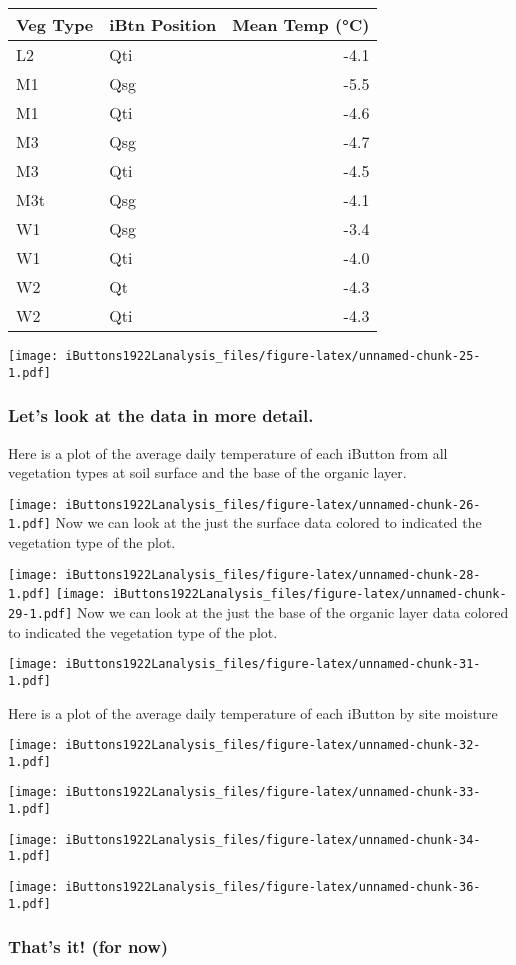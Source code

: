 \documentclass[
]{article}
\begin{document}
\begin{longtable}[]{@{}llr@{}}
\toprule\noalign{}
Veg Type & iBtn Position & Mean Temp (°C) \\
\midrule\noalign{}
\endhead
\bottomrule\noalign{}
\endlastfoot
L2 & Qti & -4.1 \\
M1 & Qsg & -5.5 \\
M1 & Qti & -4.6 \\
M3 & Qsg & -4.7 \\
M3 & Qti & -4.5 \\
M3t & Qsg & -4.1 \\
W1 & Qsg & -3.4 \\
W1 & Qti & -4.0 \\
W2 & Qt & -4.3 \\
W2 & Qti & -4.3 \\
\end{longtable}

\texttt{[image: iButtons1922Lanalysis\_files/figure-latex/unnamed-chunk-25-1.pdf]}

\subsubsection{Let's look at the data in more
detail.}\label{lets-look-at-the-data-in-more-detail.}

Here is a plot of the average daily temperature of each iButton from all
vegetation types at soil surface and the base of the organic layer.

\texttt{[image: iButtons1922Lanalysis\_files/figure-latex/unnamed-chunk-26-1.pdf]}
Now we can look at the just the surface data colored to indicated the
vegetation type of the plot.

\texttt{[image: iButtons1922Lanalysis\_files/figure-latex/unnamed-chunk-28-1.pdf]}
\texttt{[image: iButtons1922Lanalysis\_files/figure-latex/unnamed-chunk-29-1.pdf]}
Now we can look at the just the base of the organic layer data colored
to indicated the vegetation type of the plot.

\texttt{[image: iButtons1922Lanalysis\_files/figure-latex/unnamed-chunk-31-1.pdf]}

Here is a plot of the average daily temperature of each iButton by site
moisture

\texttt{[image: iButtons1922Lanalysis\_files/figure-latex/unnamed-chunk-32-1.pdf]}

\texttt{[image: iButtons1922Lanalysis\_files/figure-latex/unnamed-chunk-33-1.pdf]}

\texttt{[image: iButtons1922Lanalysis\_files/figure-latex/unnamed-chunk-34-1.pdf]}

\texttt{[image: iButtons1922Lanalysis\_files/figure-latex/unnamed-chunk-36-1.pdf]}

\subsubsection{That's it! (for now)}\label{thats-it-for-now}
\end{document}
